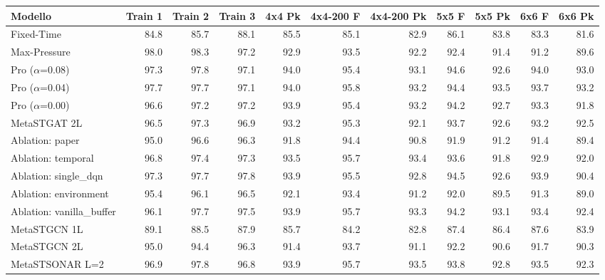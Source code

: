 \begin{table}
  \centering
  \tiny
  \begin{tabular}{@{}lrrrrrrrrrr@{}}
    \toprule
    Modello                   & Train 1 & Train 2 & Train 3 & 4x4 Pk & 4x4-200 F & 4x4-200 Pk & 5x5 F & 5x5 Pk & 6x6 F & 6x6 Pk \\
    \midrule
    Fixed-Time                & 84.8    & 85.7    & 88.1    & 85.5   & 85.1      & 82.9       & 86.1  & 83.8   & 83.3  & 81.6   \\
    Max-Pressure              & 98.0    & 98.3    & 97.2    & 92.9   & 93.5      & 92.2       & 92.4  & 91.4   & 91.2  & 89.6   \\
    Pro ($\alpha$=0.08)       & 97.3    & 97.8    & 97.1    & 94.0   & 95.4      & 93.1       & 94.6  & 92.6   & 94.0  & 93.0   \\
    Pro ($\alpha$=0.04)       & 97.7    & 97.7    & 97.1    & 94.0   & 95.8      & 93.2       & 94.4  & 93.5   & 93.7  & 93.2   \\
    Pro ($\alpha$=0.00)       & 96.6    & 97.2    & 97.2    & 93.9   & 95.4      & 93.2       & 94.2  & 92.7   & 93.3  & 91.8   \\
    MetaSTGAT 2L              & 96.5    & 97.3    & 96.9    & 93.2   & 95.3      & 92.1       & 93.7  & 92.6   & 93.2  & 92.5   \\
    Ablation: paper           & 95.0    & 96.6    & 96.3    & 91.8   & 94.4      & 90.8       & 91.9  & 91.2   & 91.4  & 89.4   \\
    Ablation: temporal        & 96.8    & 97.4    & 97.3    & 93.5   & 95.7      & 93.4       & 93.6  & 91.8   & 92.9  & 92.0   \\
    Ablation: single\_dqn     & 97.3    & 97.7    & 97.8    & 93.9   & 95.5      & 92.8       & 94.5  & 92.6   & 93.9  & 90.4   \\
    Ablation: environment     & 95.4    & 96.1    & 96.5    & 92.1   & 93.4      & 91.2       & 92.0  & 89.5   & 91.3  & 89.0   \\
    Ablation: vanilla\_buffer & 96.1    & 97.7    & 97.5    & 93.9   & 95.7      & 93.3       & 94.2  & 93.1   & 93.4  & 92.4   \\
    MetaSTGCN 1L              & 89.1    & 88.5    & 87.9    & 85.7   & 84.2      & 82.8       & 87.4  & 86.4   & 87.6  & 83.9   \\
    MetaSTGCN 2L              & 95.0    & 94.4    & 96.3    & 91.4   & 93.7      & 91.1       & 92.2  & 90.6   & 91.7  & 90.3   \\
    MetaSTSONAR L=2           & 96.9    & 97.8    & 96.8    & 93.9   & 95.7      & 93.5       & 93.8  & 92.8   & 93.5  & 92.3   \\

\end{tabular}
\end{table}
